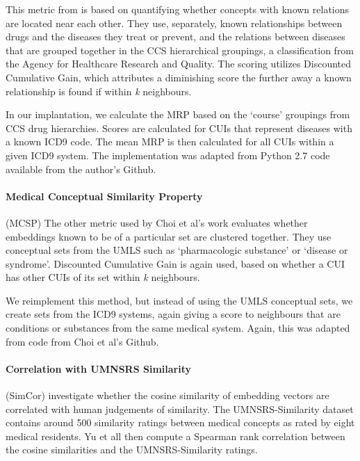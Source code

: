 \documentclass[11pt,a4paper]{article}
\begin{document}
This metric from \cite{choiLearningLowDimensionalRepresentations2016} is based on quantifying whether concepts with known relations are located near each other. They use, separately, known relationships between drugs and the diseases they treat or prevent, and the relations between diseases that are grouped together in the CCS hierarchical groupings, a classification from the Agency for Healthcare Research and Quality. The scoring utilizes Discounted Cumulative Gain, which attributes a diminishing score the further away a known relationship is found if within \emph{k} neighbours. 

In our implantation, we calculate the MRP based on the `course' groupings from CCS drug hierarchies. Scores are calculated for CUIs that represent diseases with a known ICD9 code. The mean MRP is then calculated for all CUIs within a given ICD9 system. The implementation was adapted from Python 2.7 code available from the author's Github.


\paragraph{Medical Conceptual Similarity Property}(MCSP) The other metric used by Choi et al's work evaluates whether embeddings known to be of a particular set are clustered together. They use conceptual sets from the UMLS such as `pharmacologic substance' or `disease or syndrome'.  Discounted Cumulative Gain is again used, based on whether a CUI has other CUIs of its set within \emph{k} neighbours. 

We reimplement this method, but instead of using the UMLS conceptual sets, we create sets from the ICD9 systems, again giving a score to neighbours that are conditions or substances from the same medical system. Again, this was adapted from code from Choi et al's Github.  

\paragraph{Correlation with UMNSRS Similarity}(SimCor)
\cite{yuRetrofittingConceptVector2017} investigate whether the cosine similarity of embedding vectors are correlated with human judgements of similarity. The UMNSRS-Similarity dataset \cite{pakhomovSemanticRelatednessSimilarity2018} contains around 500 similarity ratings between medical concepts as rated by eight medical residents. Yu et all then compute a Spearman rank correlation between the cosine similarities and the UMNSRS-Similarity ratings.
\end{document}
